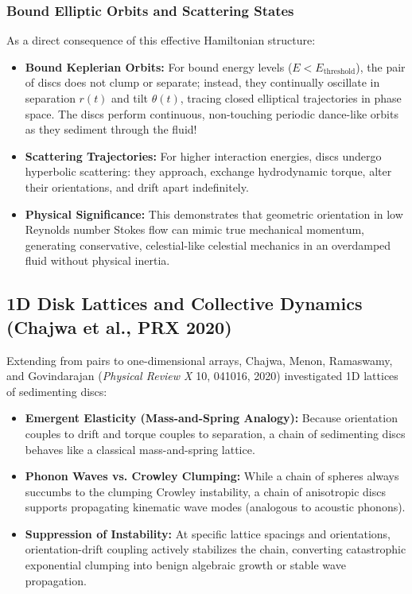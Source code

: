 \documentclass[11pt,a4paper]{article}
\begin{document}
\subsubsection{Bound Elliptic Orbits and Scattering States}
As a direct consequence of this effective Hamiltonian structure:
\begin{itemize}
    \item \textbf{Bound Keplerian Orbits:} For bound energy levels ($E < E_{\text{threshold}}$), the pair of discs does not clump or separate; instead, they continually oscillate in separation $r(t)$ and tilt $\theta(t)$, tracing closed elliptical trajectories in phase space. The discs perform continuous, non-touching periodic dance-like orbits as they sediment through the fluid!
    \item \textbf{Scattering Trajectories:} For higher interaction energies, discs undergo hyperbolic scattering: they approach, exchange hydrodynamic torque, alter their orientations, and drift apart indefinitely.
    \item \textbf{Physical Significance:} This demonstrates that geometric orientation in low Reynolds number Stokes flow can mimic true mechanical momentum, generating conservative, celestial-like celestial mechanics in an overdamped fluid without physical inertia.
\end{itemize}

\subsection{1D Disk Lattices and Collective Dynamics (Chajwa et al., PRX 2020)}
Extending from pairs to one-dimensional arrays, Chajwa, Menon, Ramaswamy, and Govindarajan (\emph{Physical Review X} 10, 041016, 2020) investigated 1D lattices of sedimenting discs:
\begin{itemize}
    \item \textbf{Emergent Elasticity (Mass-and-Spring Analogy):} Because orientation couples to drift and torque couples to separation, a chain of sedimenting discs behaves like a classical mass-and-spring lattice.
    \item \textbf{Phonon Waves vs. Crowley Clumping:} While a chain of spheres always succumbs to the clumping Crowley instability, a chain of anisotropic discs supports propagating kinematic wave modes (analogous to acoustic phonons).
    \item \textbf{Suppression of Instability:} At specific lattice spacings and orientations, orientation-drift coupling actively stabilizes the chain, converting catastrophic exponential clumping into benign algebraic growth or stable wave propagation.
\end{itemize}
\end{document}
